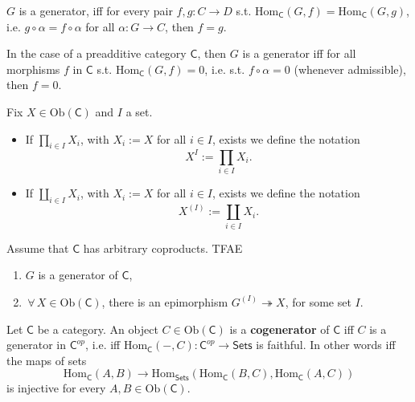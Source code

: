 \begin{rem}
	$G$ is a generator, iff for every pair $f,g: C \to D$
	s.t. $\mathrm{Hom}_{\mathsf{C}} \left( G, f \right) = \mathrm{Hom}_{\mathsf{C}} \left( G, g \right)$,
	i.e. $g \circ \alpha = f \circ \alpha$ for all $\alpha: G \to C$, then $f = g$.

	In the case of a preadditive category $\mathsf{C}$, then $G$ is a generator iff
	for all morphisms $f$ in $\mathsf{C}$ s.t. $\mathrm{Hom}_{\mathsf{C}} \left( G, f \right) = 0$,
	i.e. s.t. $f \circ \alpha = 0$ (whenever admissible), then $f = 0$.
\end{rem}

\begin{defn}
	Fix $X \in \mathrm{Ob} \left(\mathsf{C}\right)$ and $I$ a set.
	\begin{itemize}
		\item If $\prod_{i \in I} X_i$, with $X_i := X$ for all $i \in I$, exists we define the notation
			\begin{equation}
			X^I := \prod_{i \in I} X_i
			.\end{equation} 
		\item If $\coprod_{i \in I} X_i$, with $X_i := X$ for all $i \in I$, exists we define the notation
			\begin{equation}
				X^{(I)} := \coprod_{i \in I} X_i
			.\end{equation} 
	\end{itemize}
\end{defn}

\begin{prop}
	Assume that $\mathsf{C}$ has arbitrary coproducts.
	TFAE
	\begin{enumerate}
		\item $G$ is a generator of $\mathsf{C}$,
		\item $\,\forall\, X \in \mathrm{Ob} \left(\mathsf{C}\right)$, there is an epimorphism
			$G^{(I)} \twoheadrightarrow X$, for some set $I$.
	\end{enumerate}
\end{prop} 

\begin{defn}
	Let $\mathsf{C}$ be a category.
	An object $C \in \mathrm{Ob} \left(\mathsf{C}\right)$ is a \textbf{cogenerator} of $\mathsf{C}$ iff
	$C$ is a generator in $\mathsf{C}^{op}$, i.e. iff
	$\mathrm{Hom}_{\mathsf{C}} \left( -, C \right): \mathsf{C}^{op} \to \mathsf{Sets}$ is faithful.
	In other words iff the maps of sets
	 \begin{equation}
	\mathrm{Hom}_{\mathsf{C}} \left( A, B \right) \to
	\mathrm{Hom}_{\mathsf{Sets}} \left( \mathrm{Hom}_{\mathsf{C}} \left( B, C \right), 
	\mathrm{Hom}_{\mathsf{C}} \left( A, C \right) \right)
	\end{equation} 
	is injective for every $A, B \in \mathrm{Ob} \left(\mathsf{C}\right)$.
\end{defn}

